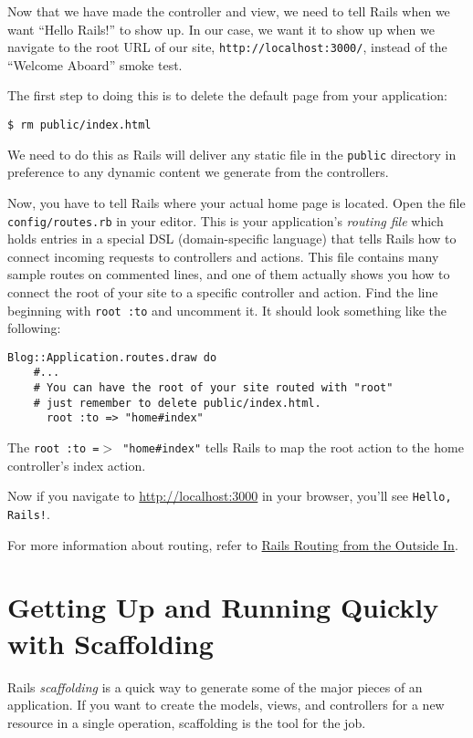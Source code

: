 \documentclass[10pt]{book}
\begin{document}
Now that we have made the controller and view, we need to tell Rails when we want “Hello Rails!” to show up. In our case, we want it to show up when we navigate to the root URL of our site, \verb+http://localhost:3000/+, instead of the “Welcome Aboard” smoke test.

The first step to doing this is to delete the default page from your application:
\begin{verbatim}
$ rm public/index.html
\end{verbatim}

We need to do this as Rails will deliver any static file in the \texttt{public} directory in preference to any dynamic content we generate from the controllers.

Now, you have to tell Rails where your actual home page is located. Open the file \texttt{config/routes.rb} in your editor. This is your application’s \emph{routing file} which holds entries in a special DSL (domain-specific language) that tells Rails how to connect incoming requests to controllers and actions. This file contains many sample routes on commented lines, and one of them actually shows you how to connect the root of your site to a specific controller and action. Find the line beginning with \texttt{root :to} and uncomment it. It should look something like the following:


\begin{verbatim}
Blog::Application.routes.draw do
	#...
	# You can have the root of your site routed with "root"
	# just remember to delete public/index.html.
	  root :to => "home#index"
\end{verbatim}

The \texttt{root :to =$>$ "home\#index"} tells Rails to map the root action to the home controller’s index action.

Now if you navigate to \href{http://localhost:3000/}{http://localhost:3000} in your browser, you’ll see \texttt{Hello, Rails!}.

For more information about routing, refer to \href{http://guides.rubyonrails.org/routing.html}{Rails Routing from the Outside In}.

\section{ Getting Up and Running Quickly with Scaffolding}

Rails \emph{scaffolding} is a quick way to generate some of the major pieces of an application. If you want to create the models, views, and controllers for a new resource in a single operation, scaffolding is the tool for the job.
\end{document}
